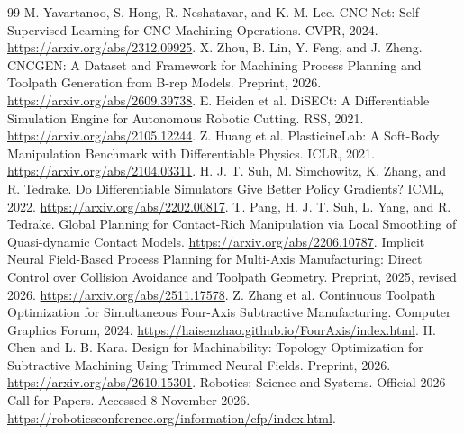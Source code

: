 \documentclass[11pt]{article}
\begin{document}
\begin{thebibliography}{99}
 M. Yavartanoo, S. Hong, R. Neshatavar, and K. M. Lee.
CNC-Net: Self-Supervised Learning for CNC Machining Operations. CVPR, 2024.
\url{https://arxiv.org/abs/2312.09925}.
 X. Zhou, B. Lin, Y. Feng, and J. Zheng.
CNCGEN: A Dataset and Framework for Machining Process Planning and Toolpath
Generation from B-rep Models. Preprint, 2026.
\url{https://arxiv.org/abs/2609.39738}.
 E. Heiden et al. DiSECt: A Differentiable Simulation Engine
for Autonomous Robotic Cutting. RSS, 2021.
\url{https://arxiv.org/abs/2105.12244}.
 Z. Huang et al. PlasticineLab: A Soft-Body Manipulation
Benchmark with Differentiable Physics. ICLR, 2021.
\url{https://arxiv.org/abs/2104.03311}.
 H. J. T. Suh, M. Simchowitz, K. Zhang, and R. Tedrake.
Do Differentiable Simulators Give Better Policy Gradients? ICML, 2022.
\url{https://arxiv.org/abs/2202.00817}.
 T. Pang, H. J. T. Suh, L. Yang, and R. Tedrake.
Global Planning for Contact-Rich Manipulation via Local Smoothing of
Quasi-dynamic Contact Models. \url{https://arxiv.org/abs/2206.10787}.
 Implicit Neural Field-Based Process Planning for Multi-Axis
Manufacturing: Direct Control over Collision Avoidance and Toolpath Geometry.
Preprint, 2025, revised 2026. \url{https://arxiv.org/abs/2511.17578}.
 Z. Zhang et al. Continuous Toolpath Optimization for Simultaneous
Four-Axis Subtractive Manufacturing. Computer Graphics Forum, 2024.
\url{https://haisenzhao.github.io/FourAxis/index.html}.
 H. Chen and L. B. Kara. Design for Machinability: Topology
Optimization for Subtractive Machining Using Trimmed Neural Fields. Preprint,
2026. \url{https://arxiv.org/abs/2610.15301}.
 Robotics: Science and Systems. Official 2026 Call for Papers.
Accessed 8 November 2026.
\url{https://roboticsconference.org/information/cfp/index.html}.
\end{thebibliography}
\end{document}
